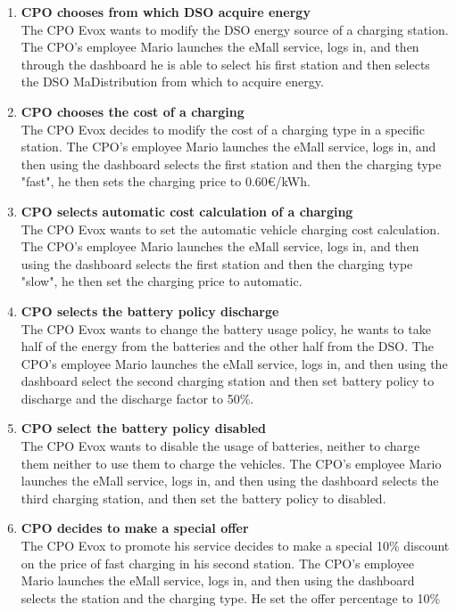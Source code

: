 \begin{enumerate}
    \item \textbf{CPO chooses from which DSO acquire energy}\\
    The CPO Evox wants to modify the DSO energy source of a charging station. The CPO's employee Mario launches the eMall service, logs in, and then through the dashboard he is able to select his first station and then selects the DSO MaDistribution from which to acquire energy.
    \item \textbf{CPO chooses the cost of a charging}\\
    The CPO Evox decides to modify the cost of a charging type in a specific station. The CPO's employee Mario launches the eMall service, logs in, and then using the dashboard selects the first station and then the charging type "fast", he then sets the charging price to 0.60€/kWh.    
    \item \textbf{CPO selects automatic cost calculation of a charging}\\
    The CPO Evox wants to set the automatic vehicle charging cost calculation. The CPO's employee Mario launches the eMall service, logs in, and then using the dashboard selects the first station and then the charging type "slow", he then set the charging price to automatic.      
    \item \textbf{CPO selects the battery policy discharge}\\
    The CPO Evox wants to change the battery usage policy, he wants to take half of the energy from the batteries and the other half from the DSO. The CPO's employee Mario launches the eMall service, logs in, and then using the dashboard select the second charging station and then set battery policy to discharge and the discharge factor to 50\%.
    \item \textbf{CPO select the battery policy disabled}\\
    The CPO Evox wants to disable the usage of batteries, neither to charge them neither to use them to charge the vehicles. The CPO's employee Mario launches the eMall service, logs in, and then using the dashboard selects the third charging station, and then set the battery policy to disabled.
    \item \textbf{CPO decides to make a special offer}\\
    The CPO Evox to promote his service decides to make a special 10\% discount on the price of fast charging in his second station. The CPO's employee Mario launches the eMall service, logs in, and then using the dashboard selects the station and the charging type. He set the offer percentage to 10\%

\end{enumerate}
